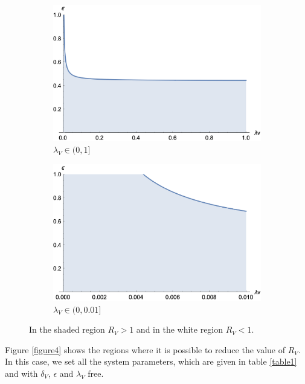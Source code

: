 \begin{figure}[h!]
\centering
\begin{subfigure}[b]{0.45\linewidth}
\includegraphics[width=\linewidth]{R0-2D-A.png}
\caption{$\lambda_V \in (0,1]$ }
\label{figure3A}
\end{subfigure}
\begin{subfigure}[b]{0.45\linewidth}
\includegraphics[width=\linewidth]{R0-2D-B.png}
\caption{$\lambda_V \in (0,0.01]$ }
\label{figure3B}
\end{subfigure}
\caption{In the shaded region $ R_V> 1 $ and in the white region $ R_V <1 $.}
\label{figure3}
\end{figure}

Figure \ref{figure4} shows the regions where it is possible to reduce the value of $ R_V $. In this case, we set all the system parameters, which are given in table \ref{table1} and with $ \delta_V $, $ \epsilon $ and $ \lambda_V $ free.



